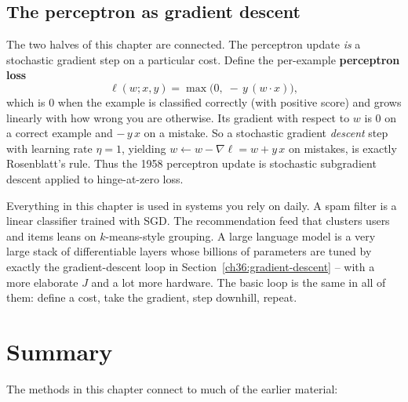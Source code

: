 \subsection{The perceptron as gradient descent}

The two halves of this chapter are connected. The perceptron update
\emph{is} a stochastic gradient step on a particular cost. Define the per-example
\textbf{perceptron loss}
\[
  \ell(w; x,y) = \max\big(0,\; -\,y\,(w\cdot x)\big),
\]
which is $0$ when the example is classified correctly (with positive score) and
grows linearly with how wrong you are otherwise. Its gradient with respect to
$w$ is $0$ on a correct example and $-\,y\,x$ on a mistake. So a stochastic
gradient \emph{descent} step with learning rate $\eta=1$, yielding
$w \leftarrow w - \nabla\ell = w + y\,x$ on mistakes, is exactly
Rosenblatt's rule. Thus the 1958 perceptron update is stochastic subgradient
descent applied to hinge-at-zero loss.

\begin{aestheticbox}
Everything in this chapter is used in systems you rely on daily. A spam
filter is a linear classifier trained with SGD. The recommendation feed that
clusters users and items leans on $k$-means-style grouping. A large language
model is a very large stack of differentiable layers whose billions of parameters
are tuned by exactly the gradient-descent loop in
Section~\ref{ch36:gradient-descent} -- with a more elaborate $J$ and a lot
more hardware. The basic loop is the same in all of them: define a cost, take
the gradient, step downhill, repeat.
\end{aestheticbox}

\section{Summary}
\label{ch36:connections}

The methods in this chapter connect to much of the earlier material:

